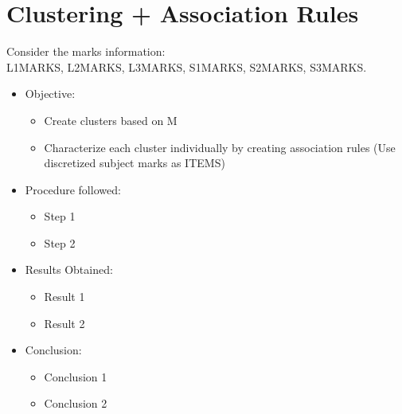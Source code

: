 \chapter{Clustering + Association Rules}
Consider the marks information: \\
L1\textunderscore MARKS, L2\textunderscore MARKS, L3\textunderscore MARKS, S1\textunderscore MARKS, S2\textunderscore MARKS, S3\textunderscore MARKS.
\begin{itemize}
	\item
	Objective:
	\begin{itemize}
		\item
		Create clusters based on M
		\item
		Characterize each cluster individually by creating association rules (Use discretized subject marks as ITEMS)
	\end{itemize}
	
	\item
	Procedure followed: 
	\begin{itemize}
		\item
		Step 1
		\item
		Step 2
	\end{itemize}
	
	\item
	Results Obtained:
	\begin{itemize}
		\item
		Result 1
		\item
		Result 2
	\end{itemize}
	
	\item
	Conclusion:
	\begin{itemize}
		\item
		Conclusion 1
		\item
		Conclusion 2
	\end{itemize}
\end{itemize}